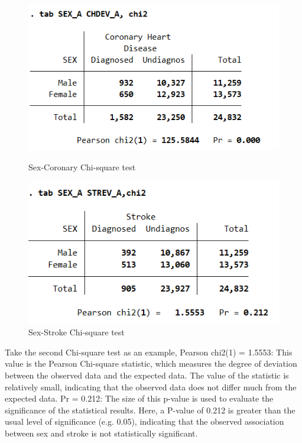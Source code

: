 \documentclass{article}
\begin{document}
\begin{figure}[!h]   
	\begin{minipage}[b]{0.45\linewidth}
		\centering
		\includegraphics[width=\textwidth]{../Image/Chi2_S1.png}
		\caption{Sex-Coronary Chi-square test}
		\label{fig:S1}
	\end{minipage}
	\hfill
	\begin{minipage}[b]{0.45\linewidth}
		\centering
		\includegraphics[width=\textwidth]{../Image/CHi2_S2.png}
		\caption{Sex-Stroke Chi-square test}
		\label{fig:S2}
	\end{minipage}
\end{figure}

Take the second Chi-square test as an example, Pearson chi2(1) = 1.5553: This value is the Pearson Chi-square statistic, which measures the degree of deviation between the observed data and the expected data. The value of the statistic is relatively small, indicating that the observed data does not differ much from the expected data. Pr = 0.212: The size of this p-value is used to evaluate the significance of the statistical results. Here, a P-value of 0.212 is greater than the usual level of significance (e.g. 0.05), indicating that the observed association between sex and stroke is not statistically significant.
\end{document}
